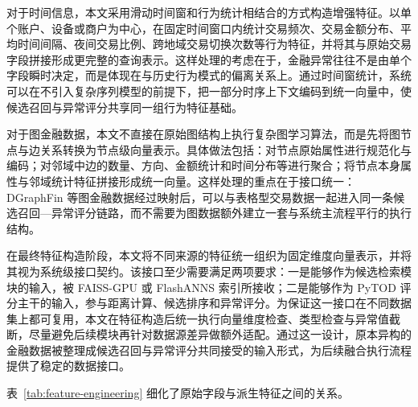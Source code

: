 对于时间信息，本文采用滑动时间窗和行为统计相结合的方式构造增强特征。以单个账户、设备或商户为中心，在固定时间窗口内统计交易频次、交易金额分布、平均时间间隔、夜间交易比例、跨地域交易切换次数等行为特征，并将其与原始交易字段拼接形成更完整的查询表示。这样处理的考虑在于，金融异常往往不是由单个字段瞬时决定，而是体现在与历史行为模式的偏离关系上。通过时间窗统计，系统可以在不引入复杂序列模型的前提下，把一部分时序上下文编码到统一向量中，使候选召回与异常评分共享同一组行为特征基础。

对于图金融数据，本文不直接在原始图结构上执行复杂图学习算法，而是先将图节点与边关系转换为节点级向量表示。具体做法包括：对节点原始属性进行规范化与编码；对邻域中边的数量、方向、金额统计和时间分布等进行聚合；将节点本身属性与邻域统计特征拼接形成统一向量。这样处理的重点在于接口统一：DGraphFin 等图金融数据经过映射后，可以与表格型交易数据一起进入同一条候选召回---异常评分链路，而不需要为图数据额外建立一套与系统主流程平行的执行结构\citep{dgraphfin_paper}。

在最终特征构造阶段，本文将不同来源的特征统一组织为固定维度向量表示，并将其视为系统级接口契约。该接口至少需要满足两项要求：一是能够作为候选检索模块的输入，被 FAISS-GPU 或 FlashANNS 索引所接收；二是能够作为 PyTOD 评分主干的输入，参与距离计算、候选排序和异常评分。为保证这一接口在不同数据集上都可复用，本文在特征构造后统一执行向量维度检查、类型检查与异常值截断，尽量避免后续模块再针对数据源差异做额外适配。通过这一设计，原本异构的金融数据被整理成候选召回与异常评分共同接受的输入形式，为后续融合执行流程提供了稳定的数据接口。

表~\ref{tab:feature-engineering} 细化了原始字段与派生特征之间的关系。


